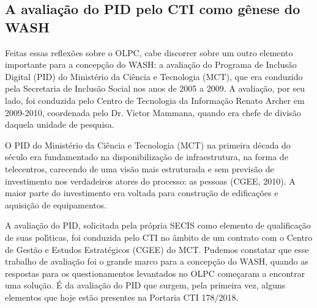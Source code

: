 \documentclass[
12pt,		%
openright,	%
twoside,  %
a4paper,			%
chapter=TITLE,		%
english,			%
french,				%
spanish,			%
brazil				%
]{USPSC-classe/USPSC}
\begin{document}
\subsection[A avalia\c{c}\~ao do PID pelo CTI como g\^enese do WASH]{A avalia\c{c}\~ao do PID pelo CTI como g\^enese do WASH}\label{A avalia\c{c}\~ao do PID pelo CTI como g\^enese do WASH}
Feitas essas reflex\~oes sobre o OLPC, cabe discorrer sobre um outro elemento importante para a concep\c{c}\~ao do WASH: a avalia\c{c}\~ao do Programa de Inclus\~ao Digital (PID) do Minist\'erio da Ci\^encia e Tecnologia (MCT), que era conduzido pela Secretaria de Inclus\~ao Social nos anos de 2005 a 2009. A avalia\c{c}\~ao, por seu lado, foi conduzida pelo Centro de Tecnologia da Informa\c{c}\~ao Renato Archer em 2009-2010, coordenada pelo Dr. Victor Mammana, quando era chefe de divis\~ao daquela unidade de pesquisa.

















O PID do Minist\'erio da Ci\^encia e Tecnologia (MCT) na primeira d\'ecada do s\'eculo era fundamentado na disponibiliza\c{c}\~ao de infraestrutura, na forma de telecentros, carecendo de uma vis\~ao mais estruturada e sem previs\~ao de investimento nos verdadeiros atores do processo: as pessoas (CGEE, 2010). A maior parte do investimento era voltada para constru\c{c}\~ao de edifica\c{c}\~oes e aquisi\c{c}\~ao de equipamentos.

















A avalia\c{c}\~ao do PID, solicitada pela pr\'opria SECIS como elemento de qualifica\c{c}\~ao de suas pol\'{\i}ticas, foi conduzida pelo CTI no \^ambito de um contrato com o Centro de Gest\~ao e Estudos Estrat\'egicos (CGEE) do MCT. Pudemos constatar que esse trabalho de avalia\c{c}\~ao foi o grande marco para a concep\c{c}\~ao do WASH, quando as respostas para os questionamentos levantados no OLPC come\c{c}aram a encontrar uma solu\c{c}\~ao. \'E da avalia\c{c}\~ao do PID que surgem, pela primeira vez, alguns elementos que hoje est\~ao presentes na Portaria CTI 178/2018.
\end{document}
